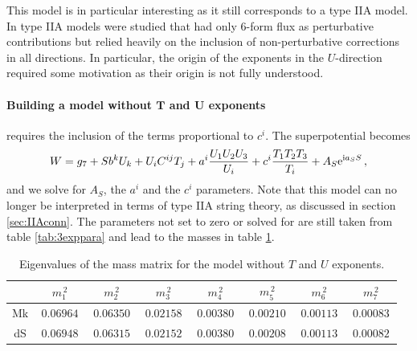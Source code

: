 \documentclass[a4paper,12pt,twoside,openright]{report}
\newcommand{\be}{\begin{equation}}
\newcommand{\ee}{\end{equation}}
\def\rmi{{\rm i}}
\def\rme{{\rm e}}
\begin{document}
This model is in particular interesting as it still corresponds to a type IIA model. In \cite{Cribiori:2019drf,Cribiori:2019bfx} type IIA models were studied that had only 6-form flux as perturbative contributions but relied heavily on the inclusion of non-perturbative corrections in all directions. In particular, the origin of the exponents in the $U$-direction required some motivation as their origin is not fully understood.

\FloatBarrier
\paragraph{Building a model without $\mathbf{T}$ and $\mathbf{U}$ exponents} requires the inclusion of the terms proportional  to $c^i$. The superpotential becomes
\be
W = g_7 + S b^k U_k + U_i C^{ij} T_j + a^i \frac{U_1 U_2 U_3}{U_i} + c^i \frac{T_1 T_2 T_3}{T_i} + A_S \rme^{\rmi a_S S}\,,
\ee
and we solve for $A_S$, the $a^i$ and the $c^i$ parameters. Note that this model can no longer be interpreted in terms of type IIA string theory, as discussed in section \ref{sec:IIAconn}. The parameters not set to zero or solved for are still taken from table \ref{tab:3exppara} and lead to the masses in table \ref{tab:noTUmass}.
\begin{table}[htb]
\center
\begin{tabular}{|c|c|c|c|c|c|c|c|}\hline
     &$\,m_1^{\,2}\,$&$\,m_2^{\,2}\,$&$\,m_3^{\,2}\,$&$\,m_4^{\,2}\,$&$\,m_5^{\,2}\,$&$\,m_6^{\,2}\,$&$\,m_7^{\,2}\,$\\\hline
Mk & $\, 0.06964 \,$ & $\, 0.06350 \,$ & $\, 0.02158 \,$ & $\, 0.00380 \,$ & $\, 0.00210 \,$ & $\, 0.00113 \,$ & $\, 0.00083 \,$ \\\hline  
dS & $\, 0.06948 \,$ & $\, 0.06315 \,$ & $\, 0.02152 \,$ & $\, 0.00380 \,$ & $\, 0.00208 \,$ & $\, 0.00113 \,$ & $\, 0.00082 \,$  \\\hline  
\end{tabular}
\caption{Eigenvalues of the mass matrix for the model without $T$ and $U$ exponents.}
\label{tab:noTUmass}
\end{table}

\FloatBarrier
\end{document}
